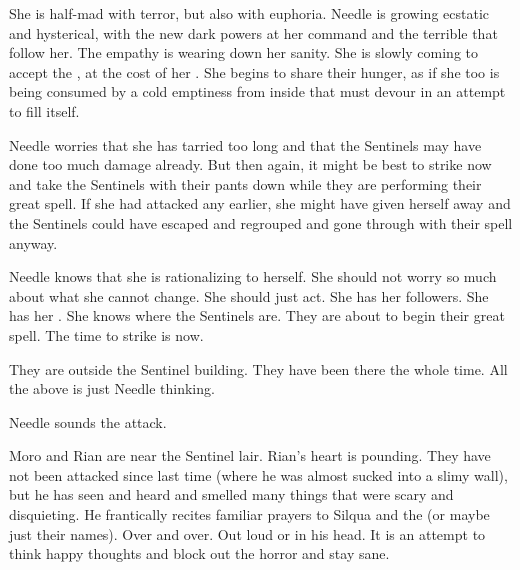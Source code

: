 She is half-mad with terror, but also with euphoria. 
Needle is growing ecstatic and hysterical, with the new dark powers at her command and the terrible \banes that follow her.
The \bane empathy is wearing down her sanity. 
She is slowly coming to accept the \banes, at the cost of her \humanity. 
She begins to share their hunger, as if she too is being consumed by a cold emptiness from inside that must devour in an attempt to fill itself. 


Needle worries that she has tarried too long and that the Sentinels may have done too much damage already.
But then again, it might be best to strike now and take the Sentinels with their pants down while they are performing their great spell.
If she had attacked any earlier, she might have given herself away and the Sentinels could have escaped and regrouped and gone through with their spell anyway. 

Needle knows that she is rationalizing to herself. 
She should not worry so much about what she cannot change. 
She should just act.
She has her followers.
She has her \banes. 
She knows where the Sentinels are.
They are about to begin their great spell. 
The time to strike is now. 

They are outside the Sentinel building. 
They have been there the whole time.
All the above is just Needle thinking. 

Needle sounds the attack. 





\begin{comment}
  \section{Moro and Rian find Needle}
\end{comment}
\new
Moro and Rian are near the Sentinel lair. 
Rian's heart is pounding.
They have not been attacked since last time (where he was almost sucked into a slimy wall), but he has seen and heard and smelled many things that were scary and disquieting. 
He frantically recites familiar prayers to Silqua and the \sephiroth (or maybe just their names).
Over and over. 
Out loud or in his head.
It is an attempt to think happy thoughts and block out the horror and stay sane. 

